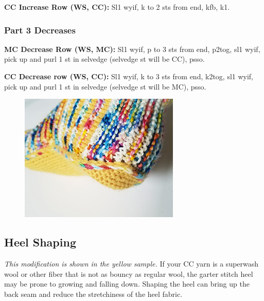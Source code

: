 \documentclass[12pt]{article}
\newcommand{\rowDir}[1]{\textbf{#1:}} %
\begin{document}
\rowDir{CC Increase Row (WS, CC)} Sl1 wyif, k to 2 sts from end, kfb, k1.

\subsubsection*{Part 3 Decreases}

\rowDir{MC Decrease Row (WS, MC)} Sl1 wyif, p to 3 sts from end, p2tog, sl1 wyif, pick up and purl 1 st in selvedge (selvedge st will be CC), psso.

\rowDir{CC Decrease row (WS, CC)} Sl1 wyif, k to 3 sts from end, k2tog, sl1 wyif, pick up and purl 1 st in selvedge (selvedge st will be MC), psso.

\vspace{-1em}
\begin{figure}
\vspace{2em}
\includegraphics[width=\linewidth]{./photos/smallVersions/yellow_shapedheel.png}
\vspace{-4em}
\end{figure} \leavevmode

\subsection*{Heel Shaping}

\emph{This modification is shown in the yellow sample.} If your CC yarn is a superwash wool or other fiber that is not as bouncy as regular wool, the garter stitch heel may be prone to growing and falling down. Shaping the heel can bring up the back seam and reduce the stretchiness of the heel fabric.
\end{document}
